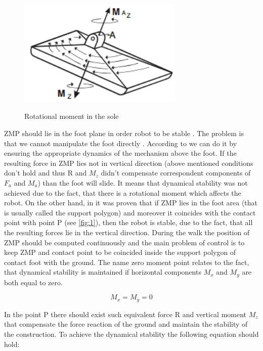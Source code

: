 \documentclass[12pt,a4paper]{report}
\begin{document}
		\begin{figure}[H]
			\vspace{-0.2cm}
			\centering
			{\includegraphics[width=0.7\textwidth]{2}}
			\caption{Rotational moment in the sole}
			\label{fig:2}
			\vspace{-0.1cm}
		\end{figure}

		 ZMP should lie in the foot plane in order robot to be stable \cite{kajita2003biped}. The problem is that we cannot manipulate the foot directly \cite{mitobe2000control}. According to \cite{vukobratovic2004zero} we can do it by ensuring the appropriate dynamics of the mechanism above the foot. If the resulting force in ZMP lies not in vertical direction (above mentioned conditions don't hold and thus R and $M_z$ didn't compensate correspondent components of $F_a$ and $M_a$) than the foot will slide. It means that dynamical stability was not achieved due to the fact, that there is a rotational moment which affects the robot. On the other hand, in \cite{sardain2004forces} it was proven that if ZMP lies in the foot area (that is usually called the support polygon) and moreover it coincides with the contact point with point P (see \cref{fig:1}), then the robot is stable, due to the fact, that all the resulting forces lie in the vertical direction. During the walk the position of ZMP should be computed continuously and the main problem of control is to keep ZMP and contact point to be coincided inside the support polygon of contact foot with the ground.
		The name zero moment point relates to the fact, that dynamical stability is maintained if horizontal components $M_x$ and $M_y$ are both equal to zero.
	
		\begin{equation}\label{eq:ZMP1}
			M_x = M_y = 0
		\end{equation}

		In the point P there should exist such equivalent force R and vertical moment $M_z$ that compensate the force reaction of the ground and maintain the stability of the construction. To achieve the dynamical stability the following equation should hold:
\end{document}
